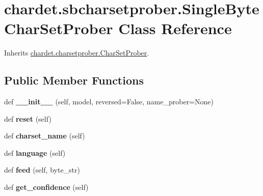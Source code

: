 \hypertarget{classchardet_1_1sbcharsetprober_1_1_single_byte_char_set_prober}{}\section{chardet.\+sbcharsetprober.\+Single\+Byte\+Char\+Set\+Prober Class Reference}
\label{classchardet_1_1sbcharsetprober_1_1_single_byte_char_set_prober}


Inherits \hyperlink{classchardet_1_1charsetprober_1_1_char_set_prober}{chardet.\+charsetprober.\+Char\+Set\+Prober}.

\subsection*{Public Member Functions}
\begin{DoxyCompactItemize}
\item 
\mbox{\label{classchardet_1_1sbcharsetprober_1_1_single_byte_char_set_prober_abf58f8009d8fabb4996103370459309b}} 
def {\bfseries \+\_\+\+\_\+init\+\_\+\+\_\+} (self, model, reversed=False, name\+\_\+prober=None)
\item 
\mbox{\label{classchardet_1_1sbcharsetprober_1_1_single_byte_char_set_prober_ac8bb7de60116fe654eb784a1ca54cd1d}} 
def {\bfseries reset} (self)
\item 
\mbox{\label{classchardet_1_1sbcharsetprober_1_1_single_byte_char_set_prober_a7fdbb43f05fcb007b3cb82050ce1dfc1}} 
def {\bfseries charset\+\_\+name} (self)
\item 
\mbox{\label{classchardet_1_1sbcharsetprober_1_1_single_byte_char_set_prober_a7a16d9c1735da9c0f9e2c58ef5d5ae50}} 
def {\bfseries language} (self)
\item 
\mbox{\label{classchardet_1_1sbcharsetprober_1_1_single_byte_char_set_prober_a21f2e0ffecacace8400f19b4a141eaa1}} 
def {\bfseries feed} (self, byte\+\_\+str)
\item 
\mbox{\label{classchardet_1_1sbcharsetprober_1_1_single_byte_char_set_prober_ad144f09642ad19e019dfc2fa338c0c21}} 
def {\bfseries get\+\_\+confidence} (self)
\end{DoxyCompactItemize}
